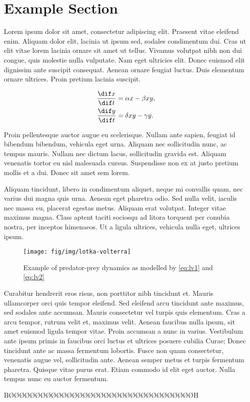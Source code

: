 \section{Example Section}
\label{sec:lvdiffeq}

Lorem ipsum dolor sit amet, consectetur adipiscing elit.
Praesent vitae eleifend enim.
Aliquam dolor elit, lacinia ut ipsum sed, sodales condimentum dui.
Cras ut elit vitae lorem lacinia ornare sit amet ut tellus.
Vivamus volutpat nibh non dui congue, quis molestie nulla vulputate.
Nam eget ultricies elit.
Donec euismod elit dignissim ante suscipit consequat.
Aenean ornare feugiat luctus.
Duis elementum ornare ultrices.
Proin pretium lacinia suscipit.

\begin{align}
  \frac{\dif x}{\dif t} &= \alpha x - \beta x y, \label{eq:lv1} \\
  \frac{\dif y}{\dif t} &= \delta xy - \gamma y .\label{eq:lv2}
\end{align}

Proin pellentesque auctor augue eu scelerisque.
Nullam ante sapien, feugiat id bibendum bibendum, vehicula eget urna.
Aliquam nec sollicitudin nunc, ac tempus mauris.
Nullam nec dictum lacus, sollicitudin gravida est.
Aliquam venenatis tortor eu nisl malesuada cursus.
Suspendisse non ex at justo pretium mollis et a dui.
Donec sit amet sem lorem.

Aliquam tincidunt, libero in condimentum aliquet, neque mi convallis quam, nec varius dui magna quis urna.
Aenean eget pharetra odio.
Sed nulla velit, iaculis nec massa eu, placerat egestas metus.
Aliquam erat volutpat.
Integer vitae maximus magna.
Class aptent taciti sociosqu ad litora torquent per conubia nostra, per inceptos himenaeos.
Ut a ligula ultrices, vehicula nulla eget, ultrices ipsum.

\begin{figure}[htbp]
  \centering
  \texttt{[image: fig/img/lotka-volterra]}
  \caption{Example of predator-prey dynamics as modelled by \eqref{eq:lv1} and \eqref{eq:lv2}}
  \label{fig:lvgraph}
\end{figure}

Curabitur hendrerit eros risus, non porttitor nibh tincidunt et.
Mauris ullamcorper orci quis tempor eleifend.
Sed eleifend arcu tincidunt ante maximus, sed sodales ante accumsan.
Mauris consectetur vel turpis quis elementum.
Cras a arcu tempor, rutrum velit et, maximus velit.
Aenean faucibus nulla ipsum, sit amet euismod ligula tempor vitae.
Proin accumsan a nunc in varius.
Vestibulum ante ipsum primis in faucibus orci luctus et ultrices posuere cubilia Curae; Donec tincidunt ante ac massa fermentum lobortis.
Fusce non quam consectetur, venenatis augue vel, sollicitudin ante.
Aenean semper metus et turpis fermentum pharetra.
Quisque vitae purus erat.
Etiam commodo id elit eget auctor.
Nulla tempus nunc eu auctor fermentum.


BØØØØØØØØØØØØØØØØØØØØØØØØØØØØØØØØØØØH
